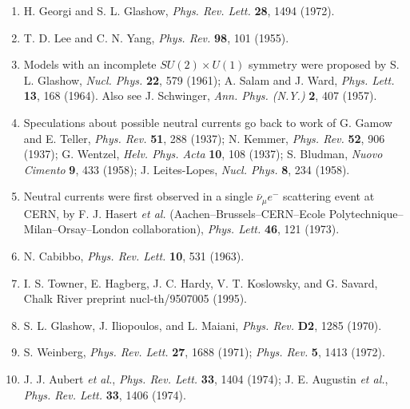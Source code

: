 \begin{enumerate}
\item {}\label{ch21-ref-6}
H. Georgi and S. L. Glashow, \emph{Phys. Rev. Lett.} \textbf{28}, 1494
(1972).

\item {}\label{ch21-ref-7}
T. D. Lee and C. N. Yang, \emph{Phys. Rev.} \textbf{98}, 101 (1955).

\item {}\label{ch21-ref-8}
Models with an incomplete $SU(2)\times U(1)$ symmetry were proposed by
S. L. Glashow, \emph{Nucl. Phys.} \textbf{22}, 579 (1961); A. Salam and
J. Ward, \emph{Phys. Lett.} \textbf{13}, 168 (1964). Also see
J. Schwinger, \emph{Ann. Phys. (N.Y.)} \textbf{2}, 407 (1957).

\item {}\label{ch21-ref-9}
Speculations about possible neutral currents go back to work of G. Gamow
and E. Teller, \emph{Phys. Rev.} \textbf{51}, 288 (1937); N. Kemmer,
\emph{Phys. Rev.} \textbf{52}, 906 (1937); G. Wentzel,
\emph{Helv. Phys. Acta} \textbf{10}, 108 (1937); S. Bludman,
\emph{Nuovo Cimento} \textbf{9}, 433 (1958); J. Leites-Lopes,
\emph{Nucl. Phys.} \textbf{8}, 234 (1958).

\item {}\label{ch21-ref-10}
Neutral currents were first observed in a single $\bar\nu_\mu e^-$
scattering event at CERN, by F. J. Hasert \emph{et al.}
(Aachen--Brussels--CERN--Ecole Polytechnique--Milan--Orsay--London
collaboration), \emph{Phys. Lett.} \textbf{46}, 121 (1973).

\item {}\label{ch21-ref-11}
N. Cabibbo, \emph{Phys. Rev. Lett.} \textbf{10}, 531 (1963).

\item {}\label{ch21-ref-12}
I. S. Towner, E. Hagberg, J. C. Hardy, V. T. Koslowsky, and G. Savard,
Chalk River preprint nucl-th/9507005 (1995).

\item {}\label{ch21-ref-13}
S. L. Glashow, J. Iliopoulos, and L. Maiani, \emph{Phys. Rev.}
\textbf{D2}, 1285 (1970).

\item {}\label{ch21-ref-14}
S. Weinberg, \emph{Phys. Rev. Lett.} \textbf{27}, 1688 (1971);
\emph{Phys. Rev.} \textbf{5}, 1413 (1972).

\item {}\label{ch21-ref-15}
J. J. Aubert \emph{et al.}, \emph{Phys. Rev. Lett.} \textbf{33}, 1404
(1974); J. E. Augustin \emph{et al.}, \emph{Phys. Rev. Lett.}
\textbf{33}, 1406 (1974).


\end{enumerate}
